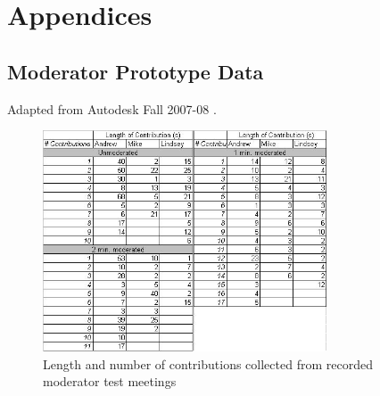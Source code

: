 \chapter{Appendices}

\section{Moderator Prototype Data}
\label{sec:Appendix1}

Adapted from Autodesk Fall 2007-08 \cite{Autodesk2008Fall}.

\begin{figure}[h!]
	\centering
		\includegraphics[width=0.75\textwidth]{Figures/Appendix1/moderatordata.JPG}
	\caption[test meetings data]{Length and number of contributions collected from recorded moderator test meetings}
	\label{fig:moderatordata}
\end{figure}
